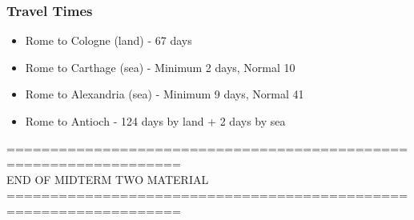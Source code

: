 \documentclass[12pt, twoside]{article}
\begin{document}
\subsubsection{Travel Times}
\begin{itemize}
\item Rome to Cologne (land) - 67 days
\item Rome to Carthage (sea) - Minimum 2 days, Normal 10
\item Rome to Alexandria (sea) - Minimum 9 days, Normal 41
\item Rome to Antioch - 124 days by land + 2 days by sea
\end{itemize}

================================================================== \\
END OF MIDTERM TWO MATERIAL \\
================================================================== \\
\end{document}
